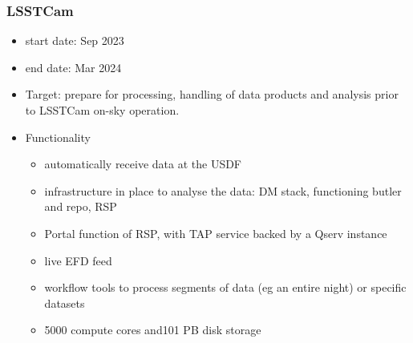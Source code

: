       \subsubsection{LSSTCam}

        \begin{itemize}
\item start date: Sep 2023
\item end date: Mar 2024
\item Target: prepare for processing, handling of data
  products and analysis prior to LSSTCam on-sky operation.
\item Functionality
  \begin{itemize}
  \item automatically receive data at the USDF
    \item infrastructure in place to analyse the data: DM stack,
      functioning butler and repo, RSP
      \item Portal function of RSP, with TAP service backed by a Qserv instance
    \item live EFD feed
      \item workflow tools to process segments of data (eg an entire
        night) or specific datasets
      \item 5000 compute cores and101 PB disk storage
              \end{itemize}
      \end{itemize}
